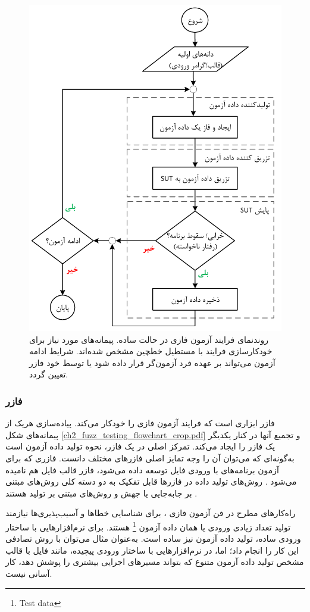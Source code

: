 \documentclass[a4paper,12pt]{article}
\begin{document}
\begin{figure}[!h]%
\centering
\includegraphics[width=0.65\linewidth, clip=true,  trim= 0 0 0 0]{ch2_fuzz_testing_flowchart_crop.pdf}
\caption[روندنمای  فرایند آزمون فازی]{
		روندنمای فرایند آزمون فازی در حالت ساده. پیمانه‌های مورد نیاز برای خودکارسازی فرایند با مستطیل خطچین مشخص شده‌اند. شرایط ادامه آزمون می‌تواند بر عهده فرد آزمون‌گر قرار داده شود یا توسط خود فازر تعیین گردد.
}
\label{fig:fuzz_testing_flowchart}
\end{figure}

\subsubsection{فازر}\label{sec:fuzzer}
فازر ابزاری است که فرایند آزمون فازی را خودکار می‌کند. پیاده‌سازی هریک از پیمانه‌های شکل
\ref{ch2_fuzz_testing_flowchart_crop.pdf}
و تجمیع آنها در کنار یکدیگر یک فازر را ایجاد می‌کند. تمرکز اصلی در یک فازر، نحوه تولید داده آزمون است به‌گونه‌ای که می‌توان آن را وجه تمایز اصلی فازرهای مختلف دانست. فازری که برای آزمون برنامه‌های با ورودی فایل توسعه داده می‌شود، فازر قالب فایل هم نامیده می‌شود \cite{Sutton:2007:FBF:1324770}. روش‌های تولید داده در فازرها قابل تفکیک به دو دسته کلی روش‌های مبتنی بر جابه‌جایی یا جهش و روش‌های مبتنی بر تولید هستند \cite{Chen2018}.

راه‌کارهای مطرح در فن آزمون فازی 
\cite{Miller:1990:ESR:96267.96279,Miller1995,Forrester:2000:ESR:1267102.1267108,Miller:2006:ESR:1145735.1145743}،
برای شناسایی خطاها و آسیب‌پذیری‌ها نیازمند تولید تعداد زیادی ورودی یا همان داده آزمون%
\footnote{Test data}
هستند. برای نرم‌افزارهایی با ساختار ورودی ساده، تولید داده آزمون نیز ساده است. به‌عنوان مثال می‌توان با روش تصادفی این کار را انجام داد؛ اما، در نرم‌افزارهایی با ساختار ورودی پیچیده، مانند فایل با قالب مشخص تولید داده آزمون متنوع که بتواند مسیرهای اجرایی بیشتری را پوشش دهد، کار آسانی نیست. 
\end{document}

